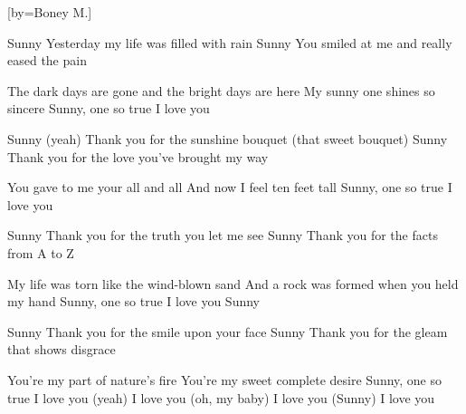 [by={Boney M.}]

  \beginverse
  Sunny
  Yesterday my life was filled with rain
  Sunny
  You smiled at me and really eased the pain
  \endverse

  \beginverse
  The dark days are gone and the bright days are here
  My sunny one shines so sincere
  Sunny, one so true
  I love you
  \endverse

  \beginverse
  Sunny (yeah)
  Thank you for the sunshine bouquet (that sweet bouquet)
  Sunny
  Thank you for the love you've brought my way
  \endverse

  \beginverse
  You gave to me your all and all
  And now I feel ten feet tall
  Sunny, one so true
  I love you
  \endverse

  \beginverse
  Sunny
  Thank you for the truth you let me see
  Sunny
  Thank you for the facts from A to Z
  \endverse

  \beginverse
  My life was torn like the wind-blown sand
  And a rock was formed when you held my hand
  Sunny, one so true
  I love you
  Sunny
  \endverse

  \beginverse
  Sunny
  Thank you for the smile upon your face
  Sunny
  Thank you for the gleam that shows disgrace
  \endverse

  \beginverse
  You're my part of nature's fire
  You're my sweet complete desire
  Sunny, one so true
  I love you (yeah)
  I love you (oh, my baby)
  I love you (Sunny)
  I love you  
  \endverse
\endsong

